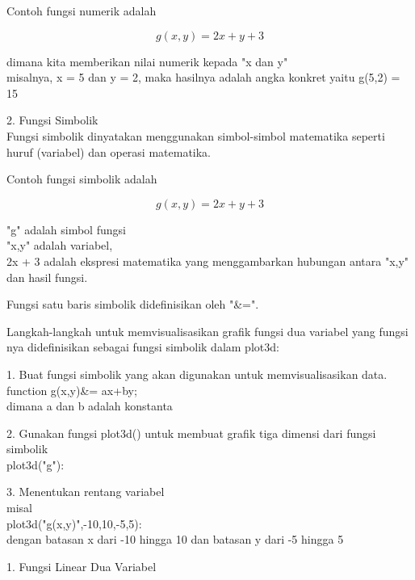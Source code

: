 \documentclass[a4paper,10pt]{article}
\begin{document}
\begin{eulernotebook}
\begin{eulercomment}
\begin{eulercomment}
\begin{eulercomment}
\begin{eulercomment}
\begin{eulercomment}
\begin{eulercomment}
\begin{eulercomment}
\begin{eulercomment}
\begin{eulercomment}
Contoh fungsi numerik adalah

\end{eulercomment}
\begin{eulerformula}
\[
g(x,y) = 2x + y + 3
\]
\end{eulerformula}
\begin{eulercomment}
dimana kita memberikan nilai numerik kepada "x dan y"\\
misalnya, x = 5 dan y = 2, maka hasilnya adalah angka konkret yaitu
g(5,2) = 15

2. Fungsi Simbolik\\
Fungsi simbolik dinyatakan menggunakan simbol-simbol matematika
seperti huruf (variabel) dan operasi matematika.

Contoh fungsi simbolik adalah

\end{eulercomment}
\begin{eulerformula}
\[
g(x,y) = 2x + y + 3
\]
\end{eulerformula}
\begin{eulercomment}
"g" adalah simbol fungsi\\
"x,y" adalah variabel,\\
2x + 3 adalah ekspresi matematika yang menggambarkan hubungan antara
"x,y" dan hasil fungsi.

\end{eulercomment}
\begin{eulercomment}
Fungsi satu baris simbolik didefinisikan oleh "\&=".

Langkah-langkah untuk memvisualisasikan grafik fungsi dua variabel
yang fungsi nya didefinisikan sebagai fungsi simbolik dalam plot3d:

1. Buat fungsi simbolik yang akan digunakan untuk memvisualisasikan
data.\\
function g(x,y)\&= ax+by;\\
dimana a dan b adalah konstanta

2. Gunakan fungsi plot3d() untuk membuat grafik tiga dimensi dari
fungsi simbolik\\
plot3d("g"):

3. Menentukan rentang variabel\\
misal\\
plot3d("g(x,y)",-10,10,-5,5):\\
dengan batasan x dari -10 hingga 10 dan batasan y dari -5 hingga 5

\end{eulercomment}
\begin{eulercomment}
1. Fungsi Linear Dua Variabel


\end{eulercomment}
\end{eulercomment}
\end{eulercomment}
\end{eulercomment}
\end{eulercomment}
\end{eulercomment}
\end{eulercomment}
\end{eulercomment}
\end{eulercomment}
\end{eulernotebook}
\end{document}
